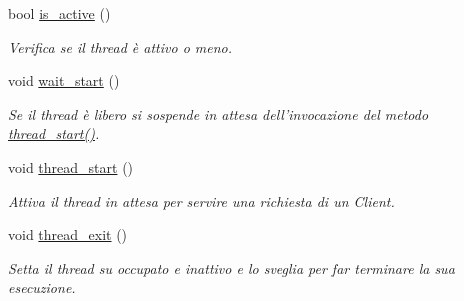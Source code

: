 \begin{DoxyCompactItemize}
bool \hyperlink{class_threads_ae56ff1063a0be830f73291b0e22a9c2b}{is\-\_\-active} ()
\begin{DoxyCompactList}\small\item\em Verifica se il {\itshape thread} è attivo o meno. \end{DoxyCompactList}\item 
\hypertarget{class_threads_a876bab16a1294650147391f9b294b522}{void \hyperlink{class_threads_a876bab16a1294650147391f9b294b522}{wait\-\_\-start} ()}\label{class_threads_a876bab16a1294650147391f9b294b522}

\begin{DoxyCompactList}\small\item\em Se il {\itshape thread} è libero si sospende in attesa dell'invocazione del metodo {\ttfamily \hyperlink{class_threads_aae72428047672adac8701f3986b84683}{thread\-\_\-start()}}. \end{DoxyCompactList}\item 
\hypertarget{class_threads_aae72428047672adac8701f3986b84683}{void \hyperlink{class_threads_aae72428047672adac8701f3986b84683}{thread\-\_\-start} ()}\label{class_threads_aae72428047672adac8701f3986b84683}

\begin{DoxyCompactList}\small\item\em Attiva il {\itshape thread} in attesa per servire una richiesta di un {\itshape Client}. \end{DoxyCompactList}\item 
\hypertarget{class_threads_aec60551054d334fb7d6c38471ebfd3bd}{void \hyperlink{class_threads_aec60551054d334fb7d6c38471ebfd3bd}{thread\-\_\-exit} ()}\label{class_threads_aec60551054d334fb7d6c38471ebfd3bd}

\begin{DoxyCompactList}\small\item\em Setta il {\itshape thread} su occupato e inattivo e lo sveglia per far terminare la sua esecuzione. \end{DoxyCompactList}\end{DoxyCompactItemize}
